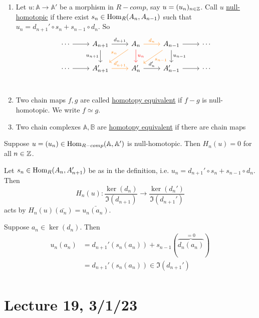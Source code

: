 \documentclass[x11names,reqno,14pt]{extarticle}
\newcommand{\A}{\mathbb{A}}
\newcommand{\B}{\mathbb{B}}
\begin{document}
\begin{enumerate}

\item Let $u:\A\to\A'$ be a morphism in $R-comp$, say $u = (u_n)_{n\in\mathbb{Z}}$. Call $u$ \underline{null-homotopic} if there exist $s_n \in {\mathrm{Hom}}_R(A_n, A_{n - 1})$ such that $u_n = d_{n + 1}'\circ s_n + s_{n - 1}\circ d_n$. So 
\[
\begin{tikzcd}
\cdots \ar[r]&A_{n + 1} \ar[d, "u_{n + 1}"'] \ar[r, "d_{n + 1}"]&A_n\ar[d, red, "u_n"]\ar[dl, orange, "s_n"']\ar[r, orange, "d_n"] & A_{n - 1} \ar[dl, orange, "s_{n - 1}"]\ar[d, "u_{n - 1}"]\ar[r]&\cdots\\
\cdots\ar[r]&A_{n + 1}' \ar[r, orange, "d_{n + 1}'"] & A_n' \ar[r, "d_n'"] & A_{n - 1}' \ar[r]&\cdots\\
\end{tikzcd}
\]

\item Two chain maps $f, g$ are called \underline{homotopy equivalent} if $f - g$ is null-homotopic. We write $f \simeq g$. 

\item Two chain complexes $\A, \B$ are \underline{homotopy equivalent} if there are chain maps

\end{enumerate}

\prop

Suppose $u = (u_n) \in \Hom_{R-comp}(\A, \A')$ is null-homotopic. Then $H_n(u) = 0$ for all $n\in\mathbb{Z}$.

\proof

Let $s_n \in {\mathrm{Hom}}_R(A_n, A_{n + 1}')$ be as in the definition, i.e. $u_n = d_{n + 1}'\circ s_n + s_{n - 1} \circ d_n$. Then
\[
H_n(u): \frac{\ker(d_n)}{\Im(d_{n + 1})} \to \frac{\ker(d_n')}{\Im(d_{n + 1}')}
\]
acts by $H_n(u)(\bar{a_n}) = \bar{u_n(a_n)}$. 

Suppose $a_n\in\ker(d_n)$. Then 
\begin{align*}
u_n(a_n) & = d_{n + 1}'(s_n(a_n)) + s_{n - 1}(\overbrace{d_n(a_n)}^{=0}) \\
			& = d_{n + 1}'(s_n(a_n)) \in \Im(d_{n + 1}') \\
\end{align*}

\section*{Lecture 19, 3/1/23}

\,
\end{document}

